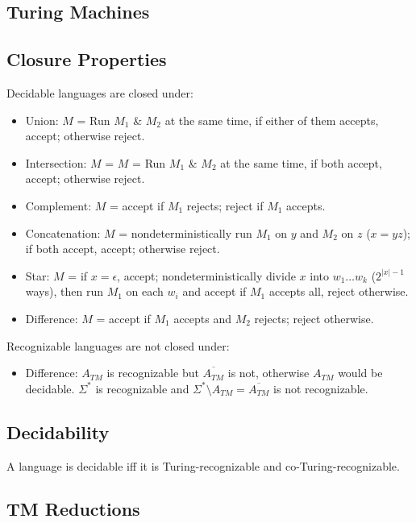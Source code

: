 \documentclass[10pt,landscape,a4paper]{article}
\newcommand{\abs}[1]{\left | #1 \right |}
\begin{document}
\begin{multicols*}{3}
\section{Turing Machines}

\subsection{Closure Properties}

Decidable languages are closed under:

\begin{itemize}
    \item Union: $M$ = Run $M_1$ \& $M_2$ at the same time, if either of them accepts, accept; otherwise reject.
    \item Intersection: $M$ = $M$ = Run $M_1$ \& $M_2$ at the same time, if both accept, accept; otherwise reject.
    \item Complement: $M$ = accept if $M_1$ rejects; reject if $M_1$ accepts.
    \item Concatenation: $M$ = nondeterministically run $M_1$ on $y$ and $M_2$ on $z$ ($x = yz$); if both accept, accept; otherwise reject.
    \item Star: $M$ = if $x = \epsilon$, accept; nondeterministically divide $x$ into $w_1\ldots w_k$ ($2^{\abs{x}-1}$ ways), then run $M_1$ on each $w_i$ and accept if $M_1$ accepts all, reject otherwise.
    \item Difference: $M$ = accept if $M_1$ accepts and $M_2$ rejects; reject otherwise.
\end{itemize}

Recognizable languages are not closed under:

\begin{itemize}
    \item Difference: $A_{TM}$ is recognizable but $\overline{A_{TM}}$ is not, otherwise $A_{TM}$ would be decidable. $\Sigma^*$ is recognizable and $\Sigma^* \setminus A_{TM} = \overline{A_{TM}}$ is not recognizable.
\end{itemize}

\subsection{Decidability}

A language is decidable iff it is Turing-recognizable and co-Turing-recognizable.

\subsection{TM Reductions}


\end{multicols*}
\end{document}
